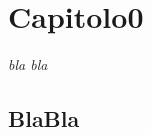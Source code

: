 \chapter{Capitolo0}
\label{chap:fond}

\begin{minipage}{12cm}\textit{bla bla}
\end{minipage}

\vspace*{1cm}

\section{BlaBla}
\label{sec:BlaBla}




